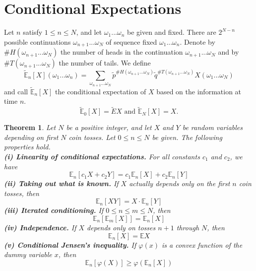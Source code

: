 \documentclass[a4paper]{article}
\newtheorem{thm}{Theorem}
\begin{document}
\section{Conditional Expectations}
Let $n$ satisfy $1\le n \le N$, and let $\omega_1...\omega_n$ be given and fixed. There are $2^{N-n}$ possible continuations $\omega_{n+1}...\omega_N$ of sequence fixed $\omega_1...\omega_n$. Denote by $\#H(\omega_{n+1}...\omega_N)$ the number of heads in the continuation $\omega_{n+1}...\omega_N$ and by $\#T(\omega_{n+1}...\omega_N)$ the number of tails. We define
$$\tilde{\mathbb{E}}_n[X](\omega_1...\omega_n)=\sum_{\omega_{n+1}...\omega_N}\tilde{p}^{\#H(\omega_{n+1}...\omega_N)}\tilde{q}^{\#T(\omega_{n+1}...\omega_N)}X(\omega_1...\omega_N)$$
and call $\tilde{\mathbb{E}}_n[X]$ the conditional expectation of $X$ based on the information at time $n$. 
$$\tilde{\mathbb{E}}_0[X] = \tilde{E}X \text{ and }\tilde{\mathbb{E}}_N[X] = X.$$
\begin{thm}
Let $N$ be a positive integer, and let $X$ and $Y$ be random variables depending on first $N$ coin tosses. Let $0\le n\le N$ be given. The following properties hold.\\
\textbf{(i) Linearity of conditional expectations.} For all constants $c_1$ and $c_2$, we have 
$$\mathbb{E}_n[c_1X+c_2Y] = c_1\mathbb{E}_n[X]+c_2\mathbb{E}_n[Y]$$
\textbf{(ii) Taking out what is known.} If $X$ actually depends only on the first $n$ coin tosses, then $$\mathbb{E}_n[XY] = X\cdot \mathbb{E}_n[Y]$$
\textbf{(iii) Iterated conditioning.} If $0\le n\le m\le N$, then
$$\mathbb{E}_n\left[\mathbb{E}_m[X]\right]=\mathbb{E}_n[X]$$
\textbf{(iv) Independence.} If $X$ depends only on tosses $n+1$ through $N$, then $$\mathbb{E}_n[X]=\mathbb{E}X$$
\textbf{(v) Conditional Jensen's inequality.} If $\varphi(x)$ is a convex function of the dummy variable $x$, then 
$$\mathbb{E}_n[\varphi(X)]\ge \varphi(\mathbb{E}_n[X])$$
\end{thm}
\end{document}
